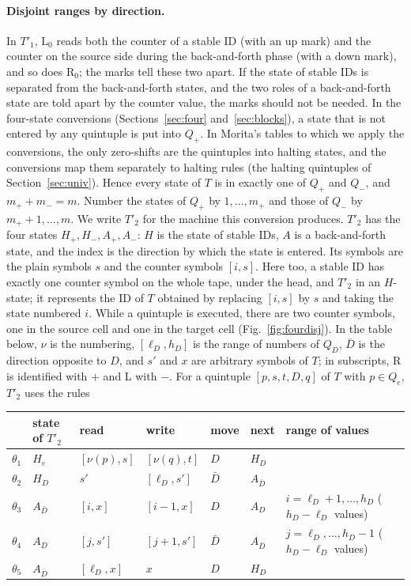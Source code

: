 \documentclass{article}
\theoremstyle{definition}
\theoremstyle{remark}
\newcommand{\rmL}{\mathrm{L}}
\newcommand{\rmR}{\mathrm{R}}
\begin{document}
\paragraph{Disjoint ranges by direction.}
In $T'_1$, $\rmL_0$ reads both the counter of a stable ID (with an up mark) and the counter on the source side during the back-and-forth phase (with a down mark), and so does $\rmR_0$; the marks tell these two apart. If the state of stable IDs is separated from the back-and-forth states, and the two roles of a back-and-forth state are told apart by the counter value, the marks should not be needed.
In the four-state conversions (Sections~\ref{sec:four} and~\ref{sec:blocks}), a state that is not entered by any quintuple is put into $Q_+$. In Morita's tables to which we apply the conversions, the only zero-shifts are the quintuples into halting states, and the conversions map them separately to halting rules (the halting quintuples of Section~\ref{sec:univ}). Hence every state of $T$ is in exactly one of $Q_+$ and $Q_-$, and $m_++m_-=m$.
Number the states of $Q_+$ by $1,\dots,m_+$ and those of $Q_-$ by $m_++1,\dots,m$.
We write $T'_2$ for the machine this conversion produces. $T'_2$ has the four states $H_+,H_-,A_+,A_-$: $H$ is the state of stable IDs, $A$ is a back-and-forth state, and the index is the direction by which the state is entered. Its symbols are the plain symbols $s$ and the counter symbols $[i,s]$.
Here too, a stable ID has exactly one counter symbol on the whole tape, under the head, and $T'_2$ in an $H$-state; it represents the ID of $T$ obtained by replacing $[i,s]$ by $s$ and taking the state numbered $i$. While a quintuple is executed, there are two counter symbols, one in the source cell and one in the target cell (Fig.~\ref{fig:fourdisj}).
In the table below, $\nu$ is the numbering, $[\ell_D,h_D]$ is the range of numbers of $Q_D$, $\bar D$ is the direction opposite to $D$, and $s'$ and $x$ are arbitrary symbols of $T$; in subscripts, R is identified with $+$ and L with $-$.
For a quintuple $[p,s,t,D,q]$ of $T$ with $p\in Q_e$, $T'_2$ uses the rules
\begin{center}
\small
\begin{tabular}{lllllll}
\toprule
& state of $T'_2$ & read & write & move & next & range of values \\
\midrule
$\theta_1$ & $H_e$ & $[\nu(p),s]$ & $[\nu(q),t]$ & $D$ & $H_D$ & \\
$\theta_2$ & $H_D$ & $s'$ & $[\ell_D,s']$ & $\bar D$ & $A_{\bar D}$ & \\
$\theta_3$ & $A_{\bar D}$ & $[i,x]$ & $[i-1,x]$ & $D$ & $A_D$ & $i=\ell_D+1,\dots,h_D$ ($h_D-\ell_D$ values) \\
$\theta_4$ & $A_D$ & $[j,s']$ & $[j+1,s']$ & $\bar D$ & $A_{\bar D}$ & $j=\ell_D,\dots,h_D-1$ ($h_D-\ell_D$ values) \\
$\theta_5$ & $A_{\bar D}$ & $[\ell_D,x]$ & $x$ & $D$ & $H_D$ & \\
\bottomrule
\end{tabular}
\end{center}
\end{document}
